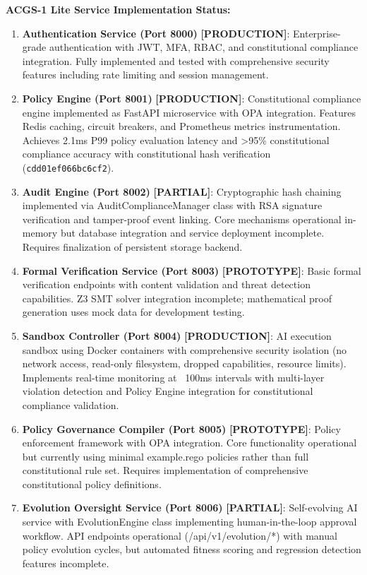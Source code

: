 \documentclass[manuscript,screen,9pt]{acmart}
\begin{document}
\textbf{ACGS-1 Lite Service Implementation Status:}
\begin{enumerate}[leftmargin=*,itemsep=1pt,parsep=1pt]
    \item \textbf{Authentication Service (Port 8000)} \textbf{[PRODUCTION]}: Enterprise-grade authentication with JWT, MFA, RBAC, and constitutional compliance integration. Fully implemented and tested with comprehensive security features including rate limiting and session management.
    \item \textbf{Policy Engine (Port 8001)} \textbf{[PRODUCTION]}: Constitutional compliance engine implemented as FastAPI microservice with OPA integration. Features Redis caching, circuit breakers, and Prometheus metrics instrumentation. Achieves 2.1ms P99 policy evaluation latency and >95\% constitutional compliance accuracy with constitutional hash verification (\texttt{cdd01ef066bc6cf2}).
    \item \textbf{Audit Engine (Port 8002)} \textbf{[PARTIAL]}: Cryptographic hash chaining implemented via AuditComplianceManager class with RSA signature verification and tamper-proof event linking. Core mechanisms operational in-memory but database integration and service deployment incomplete. Requires finalization of persistent storage backend.
    \item \textbf{Formal Verification Service (Port 8003)} \textbf{[PROTOTYPE]}: Basic formal verification endpoints with content validation and threat detection capabilities. Z3 SMT solver integration incomplete; mathematical proof generation uses mock data for development testing.
    \item \textbf{Sandbox Controller (Port 8004)} \textbf{[PRODUCTION]}: AI execution sandbox using Docker containers with comprehensive security isolation (no network access, read-only filesystem, dropped capabilities, resource limits). Implements real-time monitoring at ~100ms intervals with multi-layer violation detection and Policy Engine integration for constitutional compliance validation.
    \item \textbf{Policy Governance Compiler (Port 8005)} \textbf{[PROTOTYPE]}: Policy enforcement framework with OPA integration. Core functionality operational but currently using minimal example.rego policies rather than full constitutional rule set. Requires implementation of comprehensive constitutional policy definitions.
    \item \textbf{Evolution Oversight Service (Port 8006)} \textbf{[PARTIAL]}: Self-evolving AI service with EvolutionEngine class implementing human-in-the-loop approval workflow. API endpoints operational (/api/v1/evolution/*) with manual policy evolution cycles, but automated fitness scoring and regression detection features incomplete.
\end{enumerate}
\end{document}

